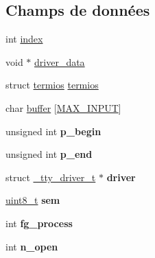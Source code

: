 \subsection*{Champs de données}
\begin{DoxyCompactItemize}
\item 
int \hyperlink{struct__tty__struct__t_a4208e736cfcd8e0b00a3c0bbfe4674f7}{index}
\item 
void $\ast$ \hyperlink{struct__tty__struct__t_a974cb784cad13e547e5cace553875f90}{driver\-\_\-data}
\item 
struct \hyperlink{structtermios}{termios} \hyperlink{struct__tty__struct__t_a39471b82fd4e3a235744e73775ac2523}{termios}
\item 
char \hyperlink{struct__tty__struct__t_ace735f0fca7a2e1c4c75f6ffb9223b19}{buffer} \mbox{[}\hyperlink{tty_8h_a00c1f0e7816626f58349492ef0720b5f}{M\-A\-X\-\_\-\-I\-N\-P\-U\-T}\mbox{]}
\item 
\hypertarget{struct__tty__struct__t_ae136497684ded03f21999f2239b3b67c}{unsigned int {\bfseries p\-\_\-begin}}\label{struct__tty__struct__t_ae136497684ded03f21999f2239b3b67c}

\item 
\hypertarget{struct__tty__struct__t_a437e8f9f913784a7f60cf95af3917b23}{unsigned int {\bfseries p\-\_\-end}}\label{struct__tty__struct__t_a437e8f9f913784a7f60cf95af3917b23}

\item 
\hypertarget{struct__tty__struct__t_a10847c2c12b0a9e131f107ec9dbe65f8}{struct \hyperlink{struct__tty__driver__t}{\-\_\-tty\-\_\-driver\-\_\-t} $\ast$ {\bfseries driver}}\label{struct__tty__struct__t_a10847c2c12b0a9e131f107ec9dbe65f8}

\item 
\hypertarget{struct__tty__struct__t_ac5522c658c4a0e142e85142432fa44fe}{\hyperlink{types_8h_aba7bc1797add20fe3efdf37ced1182c5}{uint8\-\_\-t} {\bfseries sem}}\label{struct__tty__struct__t_ac5522c658c4a0e142e85142432fa44fe}

\item 
\hypertarget{struct__tty__struct__t_ad017c8b00079444a966de0a0d31b1dd7}{int {\bfseries fg\-\_\-process}}\label{struct__tty__struct__t_ad017c8b00079444a966de0a0d31b1dd7}

\item 
\hypertarget{struct__tty__struct__t_a31c54deea3b926404682b196eb366966}{int {\bfseries n\-\_\-open}}\label{struct__tty__struct__t_a31c54deea3b926404682b196eb366966}

\end{DoxyCompactItemize}


